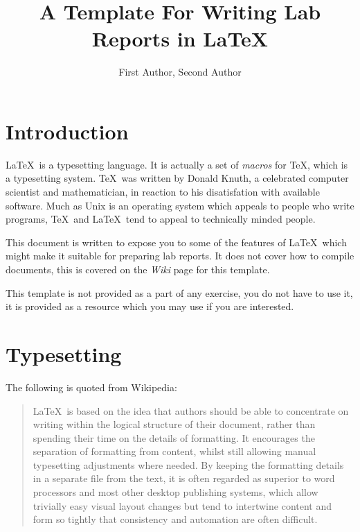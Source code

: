 \documentclass{article}	%
\author{First Author, Second Author}
\title{A Template For Writing Lab Reports in \LaTeX}
\begin{document}
\twocolumn
\thispagestyle{empty}		%
\maketitle			%



\section{Introduction}
\LaTeX\ is a typesetting language\cite{LAMPORT}.  It is actually a set
of \textit{macros} for \TeX, which is a typesetting system.  \TeX\ was
written by Donald Knuth, a celebrated computer scientist and
mathematician, in reaction to his disatisfation with available
software.  Much as Unix is an operating system which appeals to people
who write programs, \TeX\ and \LaTeX\ tend to appeal to technically
minded people.

This document is written to expose you to some of the features of
\LaTeX\ which might make it suitable for preparing lab reports.  It
does not cover how to compile documents, this is covered on the
\textit{Wiki} page for this template\cite{WIKI-LATEX-TEMPLATE}.

This template is not provided as a part of any exercise, you do not
have to use it, it is provided as a resource which you may use if you
are interested.

\section{Typesetting}
The following is quoted from Wikipedia\cite{WIKIPEDIA-LATEX}:
\begin{quote}
\LaTeX\ is based on the idea that authors should be able to concentrate
on writing within the logical structure of their document, rather than
spending their time on the details of formatting. It encourages the
separation of formatting from content, whilst still allowing manual
typesetting adjustments where needed. By keeping the formatting
details in a separate file from the text, it is often regarded as
superior to word processors and most other desktop publishing systems,
which allow trivially easy visual layout changes but tend to
intertwine content and form so tightly that consistency and automation
are often difficult.
\end{quote}
\end{document}
